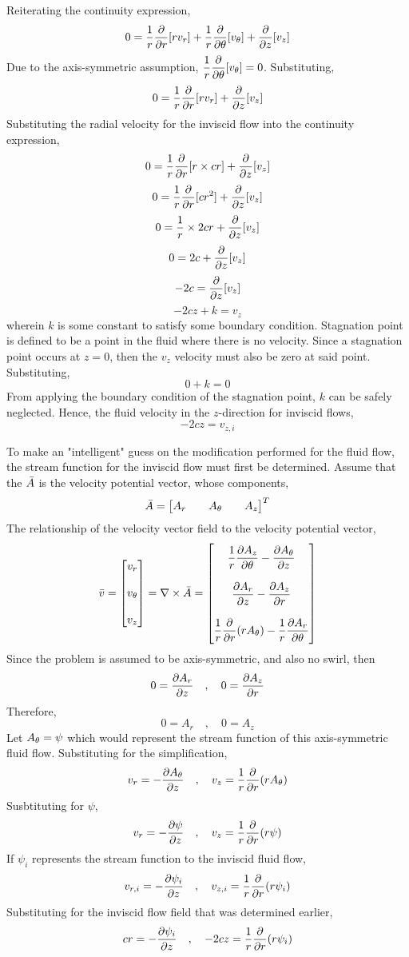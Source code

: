 \documentclass[class=report, 12pt, crop=false]{standalone}
\begin{document}
\begin{center}
Reiterating the continuity expression,
$$0= \frac{1}{r}\frac{\partial}{\partial r}[r v_r] + \frac{1}{r} \frac{\partial}{\partial \theta}[v_\theta] + \frac{\partial}{\partial z}[v_z]$$
Due to the axis-symmetric assumption, $\displaystyle{\frac{1}{r} \frac{\partial}{\partial\theta}[v_\theta]=0}$. Substituting,
$$0= \frac{1}{r}\frac{\partial}{\partial r}[r v_r] + \frac{\partial}{\partial z}[v_z]$$
Substituting the radial velocity for the inviscid flow into the continuity expression,
$$0= \frac{1}{r}\frac{\partial}{\partial r}[r \times cr] + \frac{\partial}{\partial z}[v_z]$$
$$0= \frac{1}{r}\frac{\partial}{\partial r}[cr^2] + \frac{\partial}{\partial z}[v_z]$$
$$0= \frac{1}{r} \times 2cr + \frac{\partial}{\partial z}[v_z]$$
$$0=  2c + \frac{\partial}{\partial z}[v_z]$$
$$-2c = \frac{\partial}{\partial z}[v_z]$$
$$-2cz + k = v_z$$
wherein $k$ is some constant to satisfy some boundary condition. Stagnation point is defined to be a point in the fluid where there is no velocity. Since a stagnation point occurs at $z=0$, then the $v_z$ velocity must also be zero at said point. Substituting,
$$0 + k = 0$$
From applying the boundary condition of the stagnation point, $k$ can be safely neglected. Hence, the fluid velocity in the $z$-direction for inviscid flows,
$$-2cz = v_{z,i}$$

To make an "intelligent" guess on the modification performed for the fluid flow, the stream function for the inviscid flow must first be determined. Assume that the $\bar{A}$ is the velocity potential vector, whose components,
$$\bar{A} = \begin{bmatrix} A_r && A_\theta && A_z \end{bmatrix}^T$$
The relationship of the velocity vector field to the velocity potential vector,
$$\bar{v} = \begin{bmatrix} v_r \\~\\ v_\theta \\~\\ v_z \end{bmatrix} = \nabla\times\bar{A} = \begin{bmatrix}
\displaystyle{\frac{1}{r}\frac{\partial A_z}{\partial\theta} - \frac{\partial A_\theta}{\partial z}} \\~\\
\displaystyle{\frac{\partial A_r}{\partial z} - \frac{\partial A_z}{\partial r}} \\~\\
\displaystyle{\frac{1}{r}\frac{\partial}{\partial r}(rA_\theta) - \frac{1}{r}\frac{\partial A_r}{\partial\theta}}
\end{bmatrix}$$
Since the problem is assumed to be axis-symmetric, and also no swirl, then
$$0=\frac{\partial A_r}{\partial z} \quad,\quad 0=\frac{\partial A_z}{\partial r}$$
Therefore,
$$0= A_r \quad,\quad 0= A_z$$
Let $A_\theta = \psi$ which would represent the stream function of this axis-symmetric fluid flow. Substituting for the simplification,
$$v_r =  - \frac{\partial A_\theta}{\partial z} \quad,\quad v_z = \frac{1}{r}\frac{\partial}{\partial r}(rA_\theta)$$
Susbtituting for $\psi$,
$$v_r =  -\frac{\partial \psi}{\partial z} \quad,\quad v_z = \frac{1}{r}\frac{\partial}{\partial r}(r\psi)$$
If $\psi_i$ represents the stream function to the inviscid fluid flow,
$$v_{r,i} =  -\frac{\partial \psi_i}{\partial z} \quad,\quad v_{z,i} = \frac{1}{r}\frac{\partial}{\partial r}(r\psi_i)$$
Substituting for the inviscid flow field that was determined earlier,
$$cr =  -\frac{\partial \psi_i}{\partial z} \quad,\quad -2cz = \frac{1}{r}\frac{\partial}{\partial r}(r\psi_i)$$


\end{center}
\end{document}
